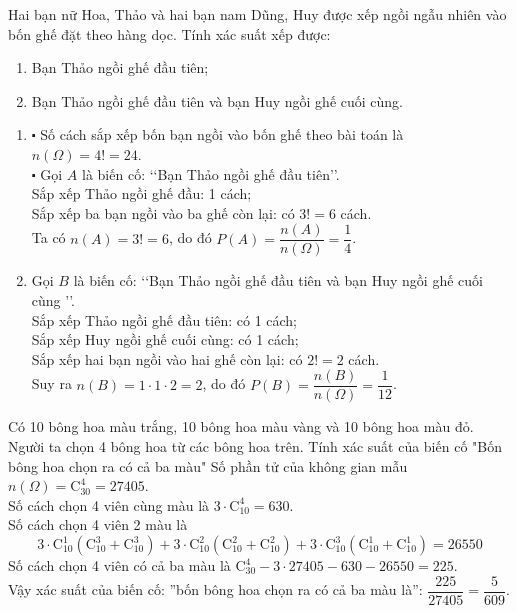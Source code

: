 \begin{bt}%
	Hai bạn nữ Hoa, Thảo và hai bạn nam Dũng, Huy được xếp ngồi ngẫu nhiên vào bốn ghế đặt theo hàng dọc. Tính xác suất xếp được:
	\begin{enumerate}
		\item Bạn Thảo ngồi ghế đầu tiên;
		\item Bạn Thảo ngồi ghế đầu tiên và bạn Huy ngồi ghế cuối cùng.
	\end{enumerate}
	\loigiai
	{
		\begin{enumerate}
			\item $\centerdot$  Số cách sắp xếp bốn bạn ngồi vào bốn ghế theo bài toán là $n(\Omega)=4!=24$.\\
			$\centerdot$ Gọi $A$ là biến cố: \lq\lq Bạn Thảo ngồi ghế đầu tiên\rq\rq.\\
			Sắp xếp Thảo ngồi ghế đầu: 1 cách;\\
			Sắp xếp ba bạn ngồi vào ba ghế còn lại: có $3!=6$ cách.\\
			Ta có $n(A)= 3!=6$, do đó $P(A)=\dfrac{n(A)}{n(\Omega)}=\dfrac{1}{4}$.
			\item Gọi $B$ là biến cố: \lq\lq  Bạn Thảo ngồi ghế đầu tiên và bạn Huy ngồi ghế cuối cùng   \rq\rq.\\
			Sắp xếp Thảo ngồi ghế đầu tiên:  có 1 cách;\\
			Sắp xếp Huy ngồi ghế cuối cùng: có 1 cách;\\
			Sắp xếp hai bạn ngồi vào hai ghế còn lại: có $2!=2$ cách.\\
			Suy ra $n(B)=1\cdot 1\cdot 2=2$, do đó $P(B)=\dfrac{n(B)}{n(\Omega)}=\dfrac{1}{12}$.
		\end{enumerate}
	}
\end{bt}

\begin{bt}%
	Có 10 bông hoa màu trắng, 10 bông hoa màu vàng và 10 bông hoa màu đỏ. Người ta chọn 4 bông hoa từ các bông hoa trên. Tính xác suất của biến cố "Bốn bông hoa chọn ra có cả ba màu"
	\loigiai
	{
		Số phần tử của không gian mẫu $n(\Omega)=\mathrm{C}_{30}^4=27405$.\\
		Số cách chọn 4 viên cùng màu là $3\cdot \mathrm{C}_{10}^4=630$.\\
		Số cách chọn 4 viên 2 màu là $$3\cdot \mathrm{C}_{10}^1(\mathrm{C}_{10}^3+\mathrm{C}_{10}^3)+3\cdot \mathrm{C}_{10}^2(\mathrm{C}_{10}^2+\mathrm{C}_{10}^2)+3\cdot \mathrm{C}_{10}^3(\mathrm{C}_{10}^1+\mathrm{C}_{10}^1)=26550$$
		Số cách chọn 4 viên có cả ba màu là $\mathrm{C}_{30}^4-3\cdot 27405-630-26550=225$.\\
		Vậy xác suất của biến cố: ''bốn bông hoa chọn ra có cả ba màu là'': $\dfrac{225}{27405}=\dfrac{5}{609}$.
	}
\end{bt}

